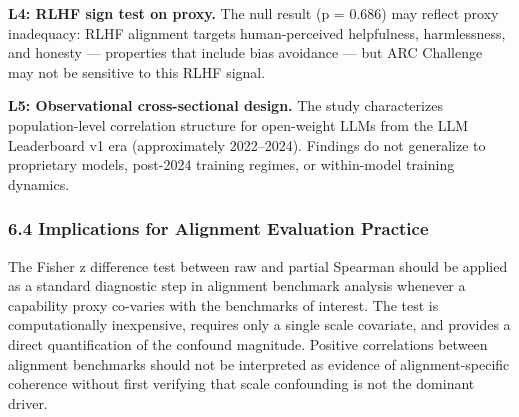 \textbf{L4: RLHF sign test on proxy.} The null result (p = 0.686) may reflect proxy inadequacy: RLHF alignment targets human-perceived helpfulness, harmlessness, and honesty --- properties that include bias avoidance --- but ARC Challenge may not be sensitive to this RLHF signal.

\textbf{L5: Observational cross-sectional design.} The study characterizes population-level correlation structure for open-weight LLMs from the LLM Leaderboard v1 era (approximately 2022--2024). Findings do not generalize to proprietary models, post-2024 training regimes, or within-model training dynamics.

\subsubsection{6.4 Implications for Alignment Evaluation Practice}

The Fisher z difference test between raw and partial Spearman should be applied as a standard diagnostic step in alignment benchmark analysis whenever a capability proxy co-varies with the benchmarks of interest. The test is computationally inexpensive, requires only a single scale covariate, and provides a direct quantification of the confound magnitude. Positive correlations between alignment benchmarks should not be interpreted as evidence of alignment-specific coherence without first verifying that scale confounding is not the dominant driver.

